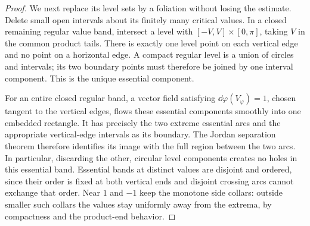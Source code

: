 \begin{proof}
We next replace its level sets by a foliation without losing the
estimate.  Delete small open intervals about its finitely many critical
values.  In a closed remaining regular value band, intersect a level
with $[-V,V]\times[0,\pi]$, taking $V$ in the common product tails.
There is exactly one level point on each vertical edge and no point
on a horizontal edge.  A compact regular level is a union of circles
and intervals; its two boundary points must therefore be joined by
one interval component.  This is the unique essential component.

For an entire closed regular band, a vector field satisfying
$\dd\varphi(V_\varphi)=1$, chosen tangent to the vertical edges,
flows these essential components smoothly into one embedded rectangle.
It has precisely the two extreme essential arcs and the appropriate
vertical-edge intervals as its boundary.  The Jordan separation theorem
therefore identifies its image with the full region between the two
arcs.  In particular, discarding the other, circular level components
creates no holes in this essential band.  Essential bands at distinct
values are disjoint and ordered, since their order is fixed at both
vertical ends and disjoint crossing arcs cannot exchange that order.
Near $1$ and $-1$ keep the monotone side collars: outside smaller such
collars the values stay uniformly away from the extrema, by compactness
and the product-end behavior.


\end{proof}
